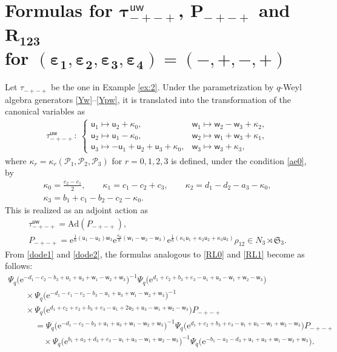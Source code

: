 \documentclass[pdftex]{sigma}
\newcommand{\e}{{\mathrm e}}
\def\ve{{\varepsilon}}
\newcommand{\uu}{{\mathsf u}}
\newcommand{\ww}{{\mathsf w}}
\numberwithin{equation}{section}
\begin{document}
\section[Formulas for tau\^uw\_-+-+, P\_-+-+ and R\_123 for
 (ve\_1,ve\_2,ve\_3,ve\_4)=(-,+,-,+)]{Formulas for $\boldsymbol{\tau^{\uu\ww}_{-+-+}}$, $\boldsymbol{P_{-+-+}}$ and $\boldsymbol{R_{123}}$\\ for
 $\boldsymbol{(\ve_1,\ve_2,\ve_3,\ve_4)=(-,+,-,+)}$}\label{app:ruw}

Let $\tau_{-+-+}$ be the one in Example \ref{ex:2}.
Under the parametrization by $q$-Weyl algebra generators \eqref{Yw}--\eqref{Ypw},
it is translated into the transformation of the canonical variables as
\begin{align}
\tau^{\uu\ww}_{-+-+}\colon\
\begin{cases}
\uu_1 \mapsto \uu_2 +\kappa_0,
&
\ww_1 \mapsto \ww_2-\ww_3+\kappa_2,
\\
\uu_2 \mapsto \uu_1-\kappa_0,
&
\ww_2 \mapsto \ww_1+\ww_3+\kappa_1,
\\
\uu_3 \mapsto -\uu_1+\uu_2+\uu_3+\kappa_0,
&
\ww_3 \mapsto \ww_3+\kappa_3,
\end{cases}
\label{uwL2}
\end{align}
where $\kappa_r=\kappa_r(\mathscr{P}_1,\mathscr{P}_2,\mathscr{P}_3)$
for $r=0, 1, 2, 3$ is defined, under the condition \eqref{ae0},
by
\begin{gather*}%
\kappa_0 = \frac{e_2-e_1}{2},\qquad
\kappa_1 = c_1-c_2+c_3,\qquad
\kappa_2 =d_1-d_2-a_3 - \kappa_0,\\
\kappa_3 = b_1+c_1-b_2-c_2-\kappa_0.
\end{gather*}
This is realized as an adjoint action as
\begin{gather*}%
\tau^{\uu\ww}_{-+-+} = \mathrm{Ad}(P_{-+-+}),
\\
P_{-+-+}=
\e^{\tfrac{1}{\hbar}(\uu_1-\uu_2)\ww_3}
\e^{\tfrac{\kappa_0}{\hbar}(\ww_1-\ww_2-\ww_3)}
\e^{\tfrac{1}{\hbar}(\kappa_1\uu_1+\kappa_2\uu_2+\kappa_3\uu_3)}\rho_{12}
\in N_3 \rtimes \mathfrak{S}_3.
\end{gather*}
From \eqref{dode1} and \eqref{dode2},
the formulas analogous to \eqref{RL0} and \eqref{RL1} become as follows:
\begin{gather}%
\Psi_q\bigl(\e^{-d_1-c_2-b_3+\uu_1+\uu_3+\ww_1-\ww_2+\ww_3}\bigr)^{-1}
\Psi_q\bigl(\e^{d_1+c_2+b_3+e_3-\uu_1+\uu_3-\ww_1+\ww_2-\ww_3}\bigr)
\nonumber \\
\qquad\times
\Psi_q\bigl(\e^{-d_1-e_1-c_2-b_3-\uu_1+\uu_3+\ww_1-\ww_2+\ww_3}\bigr)^{-1}\nonumber \\
\qquad\times
\Psi_q\bigl(\e^{d_1+c_2+e_2+b_3+e_3-\uu_1+2\uu_2+\uu_3-\ww_1+\ww_2-\ww_3}\bigr)P_{-+-+}\nonumber
\\
\phantom{\qquad\times}{}=
\Psi_q\bigl(\e^{-d_1-c_2-b_3+\uu_1+\uu_3+\ww_1-\ww_2+\ww_3}\bigr)^{-1}
\Psi_q\bigl(\e^{d_1+c_2+b_3+e_3-\uu_1+\uu_3-\ww_1+\ww_2-\ww_3}\bigr)P_{-+-+}
\nonumber\\
\phantom{\qquad\times=}{}\times
\Psi_q\bigl(\e^{b_1+a_2+d_3+e_3-\uu_1+\uu_3-\ww_1+\ww_2-\ww_3}\bigr)^{-1}
\Psi_q\bigl(\e^{-b_1-a_2-d_3+\uu_1+\uu_3+\ww_1-\ww_2+\ww_3}\bigr).
\label{RL3}
\end{gather}
\end{document}
